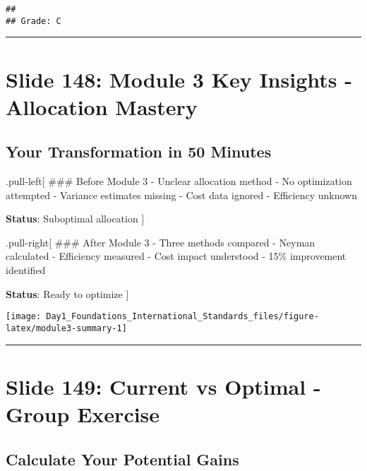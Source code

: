 \documentclass[
]{article}
\begin{document}
\begin{verbatim}
## 
## Grade: C
\end{verbatim}

\begin{center}\rule{0.5\linewidth}{0.5pt}\end{center}

\section{Slide 148: Module 3 Key Insights - Allocation
Mastery}\label{slide-148-module-3-key-insights---allocation-mastery}

\subsection{Your Transformation in 50
Minutes}\label{your-transformation-in-50-minutes}

.pull-left{[} \#\#\# Before Module 3 - Unclear allocation method - No
optimization attempted - Variance estimates missing - Cost data ignored
- Efficiency unknown

\textbf{Status}: Suboptimal allocation {]}

.pull-right{[} \#\#\# After Module 3 - Three methods compared - Neyman
calculated - Efficiency measured - Cost impact understood - 15\%
improvement identified

\textbf{Status}: Ready to optimize {]}

\texttt{[image: Day1\_Foundations\_International\_Standards\_files/figure-latex/module3-summary-1]}

\begin{center}\rule{0.5\linewidth}{0.5pt}\end{center}

\section{Slide 149: Current vs Optimal - Group
Exercise}\label{slide-149-current-vs-optimal---group-exercise}

\subsection{Calculate Your Potential
Gains}\label{calculate-your-potential-gains}
\end{document}
